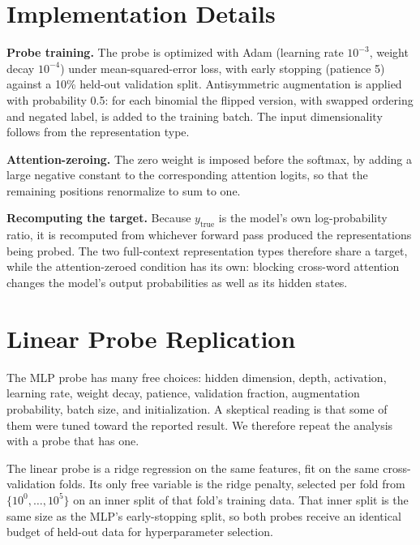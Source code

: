 \documentclass[11pt]{article}
\begin{document}
\newpage

\section{Implementation Details}\label{sec-appendix-implementation}

\textbf{Probe training.} The probe is optimized with Adam (learning rate
\(10^{-3}\), weight decay \(10^{-4}\)) under mean-squared-error loss,
with early stopping (patience 5) against a 10\% held-out validation
split. Antisymmetric augmentation is applied with probability 0.5: for
each binomial the flipped version, with swapped ordering and negated
label, is added to the training batch. The input dimensionality follows
from the representation type.

\textbf{Attention-zeroing.} The zero weight is imposed before the
softmax, by adding a large negative constant to the corresponding
attention logits, so that the remaining positions renormalize to sum to
one.

\textbf{Recomputing the target.} Because \(y_{\text{true}}\) is the
model's own log-probability ratio, it is recomputed from whichever
forward pass produced the representations being probed. The two
full-context representation types therefore share a target, while the
attention-zeroed condition has its own: blocking cross-word attention
changes the model's output probabilities as well as its hidden states.

\newpage

\section{Linear Probe Replication}\label{sec-appendix-linear}

The MLP probe has many free choices: hidden dimension, depth,
activation, learning rate, weight decay, patience, validation fraction,
augmentation probability, batch size, and initialization. A skeptical
reading is that some of them were tuned toward the reported result. We
therefore repeat the analysis with a probe that has one.

The linear probe is a ridge regression on the same features, fit on the
same cross-validation folds. Its only free variable is the ridge
penalty, selected per fold from \(\{10^0, \ldots, 10^5\}\) on an inner
split of that fold's training data. That inner split is the same size as
the MLP's early-stopping split, so both probes receive an identical
budget of held-out data for hyperparameter selection.
\end{document}
